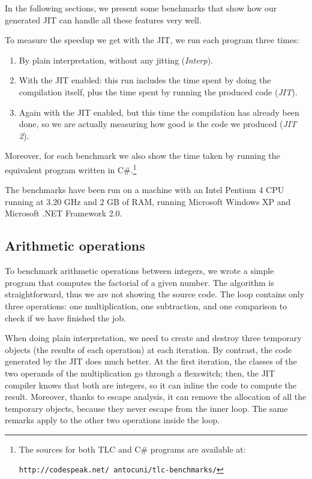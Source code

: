 In the following sections, we present some benchmarks that show how our
generated JIT can handle all these features very well.

To measure the speedup we get with the JIT, we run each program three times:

\begin{enumerate}
\item By plain interpretation, without any jitting (\emph{Interp}).
\item With the JIT enabled: this run includes the time spent by doing the
  compilation itself, plus the time spent by running the produced code (\emph{JIT}).
\item Again with the JIT enabled, but this time the compilation has already
  been done, so we are actually measuring how good is the code we produced (\emph{JIT 2}).
\end{enumerate}

Moreover, for each benchmark we also show the time taken by running the
equivalent program written in C\#.\footnote{The sources for both TLC and C\#
  programs are available at:

  \texttt{http://codespeak.net/~antocuni/tlc-benchmarks/}}

The benchmarks have been run on a machine with an Intel Pentium 4 CPU running at
3.20 GHz and 2 GB of RAM, running Microsoft Windows XP and Microsoft .NET
Framework 2.0.

\subsection{Arithmetic operations}

To benchmark arithmetic operations between integers, we wrote a simple program
that computes the factorial of a given number.  The algorithm is
straightforward, thus we are not showing the source code.  The loop contains only three operations: one
multiplication, one subtraction, and one comparison to check if we have
finished the job.

When doing plain interpretation, we need to create and destroy three temporary
objects (the results of each operation) at each iteration.  By contrast, the code generated by the JIT does
much better.  At the first iteration, the classes of the two operands of the
multiplication go through a flexswitch; then, the JIT compiler knows that both are
integers, so it can inline the code to compute the result.  Moreover, thanks to escape analysis,
it can remove the allocation of all the temporary objects, because they never escape from
the inner loop.  The same remarks apply to the other two operations inside
the loop.

